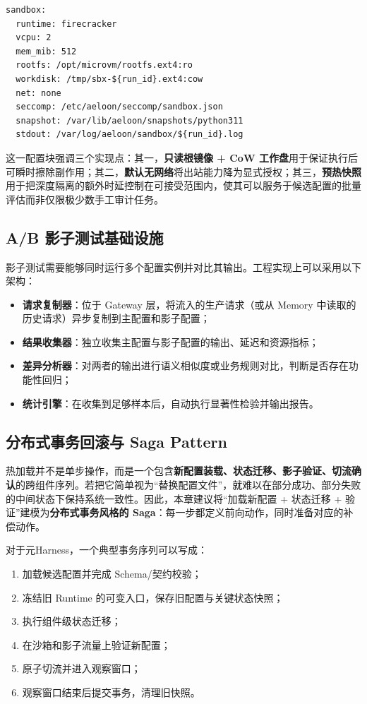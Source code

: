 \begin{verbatim}
sandbox:
  runtime: firecracker
  vcpu: 2
  mem_mib: 512
  rootfs: /opt/microvm/rootfs.ext4:ro
  workdisk: /tmp/sbx-${run_id}.ext4:cow
  net: none
  seccomp: /etc/aeloon/seccomp/sandbox.json
  snapshot: /var/lib/aeloon/snapshots/python311
  stdout: /var/log/aeloon/sandbox/${run_id}.log
\end{verbatim}

这一配置块强调三个实现点：其一，\textbf{只读根镜像 + CoW 工作盘}用于保证执行后可瞬时擦除副作用；其二，\textbf{默认无网络}将出站能力降为显式授权；其三，\textbf{预热快照}用于把深度隔离的额外时延控制在可接受范围内，使其可以服务于候选配置的批量评估而非仅限极少数手工审计任务。

\subsection{A/B 影子测试基础设施}

影子测试需要能够同时运行多个配置实例并对比其输出。工程实现上可以采用以下架构：
\begin{itemize}
    \item \textbf{请求复制器}：位于 Gateway 层，将流入的生产请求（或从 Memory 中读取的历史请求）异步复制到主配置和影子配置；
    \item \textbf{结果收集器}：独立收集主配置与影子配置的输出、延迟和资源指标；
    \item \textbf{差异分析器}：对两者的输出进行语义相似度或业务规则对比，判断是否存在功能性回归；
    \item \textbf{统计引擎}：在收集到足够样本后，自动执行显著性检验并输出报告。
\end{itemize}

\subsection{分布式事务回滚与 Saga Pattern}

热加载并不是单步操作，而是一个包含\textbf{新配置装载、状态迁移、影子验证、切流确认}的跨组件序列。若把它简单视为“替换配置文件”，就难以在部分成功、部分失败的中间状态下保持系统一致性。因此，本章建议将“加载新配置 + 状态迁移 + 验证”建模为\textbf{分布式事务风格的 Saga}：每一步都定义前向动作，同时准备对应的补偿动作。

对于元Harness，一个典型事务序列可以写成：
\begin{enumerate}
    \item 加载候选配置并完成 Schema/契约校验；
    \item 冻结旧 Runtime 的可变入口，保存旧配置与关键状态快照；
    \item 执行组件级状态迁移；
    \item 在沙箱和影子流量上验证新配置；
    \item 原子切流并进入观察窗口；
    \item 观察窗口结束后提交事务，清理旧快照。
\end{enumerate}

